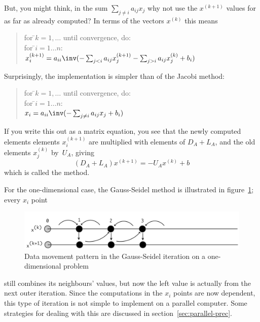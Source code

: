 But, you might think, in the sum $\sum_{j\not=i} a_{ij}x_j$ why
not use the $x^{(k+1)}$ values for as far as already computed?
In terms of the vectors $x^{(k)}$ this means
\begin{quote}
  \begin{tabbing}
    for \=$k=1,\ldots$ until convergence, do:\\
    \>for \=$i=1\ldots n$:\\
    \>\>$x^{(k+1)}_i = a_{ii}\inv (-\sum_{j<i} a_{ij}x_j^{(k+1)} -
                      \sum_{j>i} a_{ij}x_j^{(k)}+b_i)$\\
  \end{tabbing}
\end{quote}
Surprisingly, the implementation is simpler than of the Jacobi method:
\begin{quote}
  \begin{tabbing}
    for \=$k=1,\ldots$ until convergence, do:\\
    \>for \=$i=1\ldots n$:\\
    \>\>$x_i = a_{ii}\inv (-\sum_{j\not=i} a_{ij}x_j +b_i)$\\
  \end{tabbing}
\end{quote}
If you write this out as a matrix equation, you see that
the newly computed elements elements $x^{(k+1)}_i$ are 
multiplied with elements of $D_A+L_A$,
and the old elements $x^{(k)}_j$ by~$U_A$, giving
\[ (D_A+L_A)x^{(k+1)}=-U_Ax^{(k)}+b \]
which is called the  method.

For the one-dimensional case, the Gauss-Seidel method
is illustrated in figure~\ref{fig:1d-sor}; every $x_i$ point
\begin{figure}[ht]
  \includegraphics[scale=.08]{graphics-public/sor}
  \caption{Data movement pattern in the Gauss-Seidel iteration on a
    one-dimensional problem}
  \label{fig:1d-sor}
\end{figure}
still combines its neighbours' values, but now the left value is
actually from the next outer iteration. Since the computations in the
$x_i$ points are now dependent, this type of iteration is not simple
to implement on a parallel computer. Some strategies for dealing with
this are discussed in section~\ref{sec:parallel-prec}.

